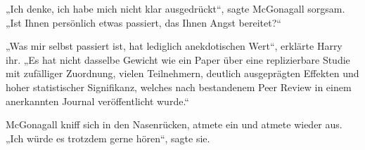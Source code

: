 „Ich denke, ich habe mich nicht klar ausgedrückt“, sagte McGonagall sorgsam.
„Ist Ihnen persönlich etwas passiert, das Ihnen Angst bereitet?“

„Was mir selbst passiert ist, hat lediglich anekdotischen Wert“, erklärte Harry ihr.
„Es hat nicht dasselbe Gewicht wie ein Paper über eine replizierbare Studie mit zufälliger Zuordnung, vielen Teilnehmern, deutlich ausgeprägten Effekten und hoher statistischer Signifikanz, welches nach bestandenem Peer Review in einem anerkannten Journal veröffentlicht wurde.“

McGonagall kniff sich in den Nasenrücken, atmete ein und atmete wieder aus.
„Ich würde es trotzdem gerne hören“, sagte sie.

